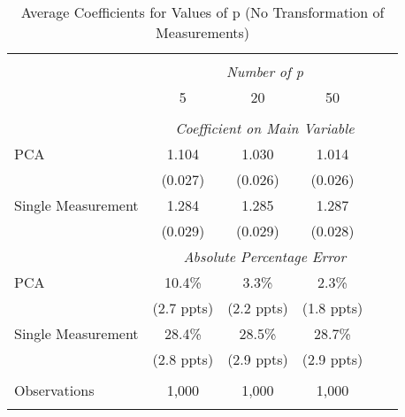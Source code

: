 \begin{table}[!htbp] \centering
  \caption{Average Coefficients for Values of p (No Transformation of Measurements) \label{sim_p_2_noexp}}
\begin{tabular}{@{\extracolsep{5pt}}lccccc}
\\[-1.8ex]\hline
\hline \\[-1.8ex]
& \multicolumn{4}{c}{\textit{Number of p}} \
\cr \
\\[-1.8ex] & 5 & 20 & 50 &\\
\hline \\[-1.8ex]
& \multicolumn{4}{c}{\textit{Coefficient on Main Variable}} \\
 PCA & 1.104 & 1.030 & 1.014 &\\
  & (0.027) & (0.026) & (0.026) &\\
  Single Measurement & 1.284 & 1.285 & 1.287 &  \\
  & (0.029) & (0.029) & (0.028) &\\
& \multicolumn{4}{c}{\textit{Absolute Percentage Error}} \\
  PCA & 10.4\% & 3.3\% & 2.3\% &  \\
   & (2.7 ppts) & (2.2 ppts) & (1.8 ppts) &\\
  Single Measurement & 28.4\% & 28.5\% & 28.7\%  & \\
  & (2.8 ppts) & (2.9 ppts) & (2.9 ppts) &\\
\hline \\[-1.8ex]
 Observations & 1,000 & 1,000 & 1,000 & \\
\hline
\hline \\[-1.8ex]
\end{tabular}
\end{table}